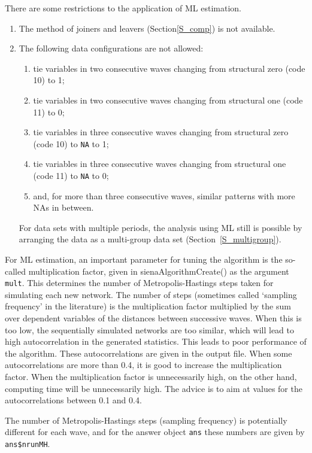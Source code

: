 \documentclass[a4paper,fleqn,11pt]{article}
\newcommand{\+}{\, + \,}
\newcommand{\sfn}[1]{\textsf{#1}}
\begin{document}
There are some restrictions to the application of ML estimation.
\begin{enumerate}
  \item The method of joiners and leavers (Section\ref{S_comp})
is not available.
  \item The following data configurations are not allowed:
\begin{enumerate}
\item tie variables in two consecutive waves changing from
    structural zero (code 10) to 1;
\item tie variables in two consecutive waves changing from
    structural one (code 11) to 0;
\item tie variables in three consecutive waves changing from
    structural zero (code 10) to \texttt{NA} to 1;
\item tie variables in three consecutive waves changing from
    structural one (code 11) to \texttt{NA} to 0;
\item and, for more than three consecutive waves, similar patterns
    with more NAs in between.
\end{enumerate}
For data sets with multiple periods, the
analysis using ML still is possible by arranging the data
as a multi-group data set (Section~\ref{S_multigroup}).
\end{enumerate}

For ML estimation, an important parameter for tuning the
algorithm is the so-called \textsf{multiplication factor},
given in \sfn{sienaAlgorithmCreate()} as the argument \texttt{mult}.
This determines the number of Metropolis-Hastings steps taken
for simulating each new network.
The number of steps (sometimes called `sampling frequency' in the literature)
is the multiplication factor multiplied by the sum over dependent variables
of the distances between successive waves.
When this is too low, the
sequentially simulated networks are too similar, which will
lead to high autocorrelation in the generated statistics.
This leads to poor performance of the algorithm.
These autocorrelations are given in the output file. When some
autocorrelations are more than 0.4, it is good to increase the
\textsf{multiplication factor}.
When the \textsf{multiplication factor} is unnecessarily high,
on the other hand, computing time will be unnecessarily high.
The advice is to aim at values for the autocorrelations
between 0.1 and 0.4.

The number of Metropolis-Hastings steps (sampling frequency)
is potentially different for each wave,
and for the answer object \texttt{ans} these numbers are
given by \texttt{ans\$nrunMH}.
\end{document}
